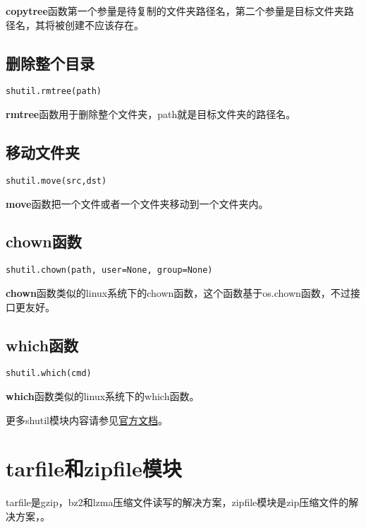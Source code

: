 \documentclass[12pt,oneside]{book}
\begin{document}
\begin{common-format}
\textbf{copytree}函数第一个参量是待复制的文件夹路径名，第二个参量是目标文件夹路径名，其将被创建不应该存在。

\section{删除整个目录}
\begin{Verbatim}
shutil.rmtree(path)
\end{Verbatim}

\textbf{rmtree}函数用于删除整个文件夹，path就是目标文件夹的路径名。

\section{移动文件夹}
\begin{Verbatim}
shutil.move(src,dst)
\end{Verbatim}
\textbf{move}函数把一个文件或者一个文件夹移动到一个文件夹内。



\section{chown函数}
\begin{Verbatim}
shutil.chown(path, user=None, group=None)
\end{Verbatim}

\textbf{chown}函数类似的linux系统下的chown函数，这个函数基于os.chown函数，不过接口更友好。


\section{which函数}
\begin{Verbatim}
shutil.which(cmd)
\end{Verbatim}

\textbf{which}函数类似的linux系统下的which函数。



\begin{large}
更多shutil模块内容请参见\href{https://docs.python.org/3.4/library/shutil.html}{官方文档}。
\end{large}


\chapter{tarfile和zipfile模块}
tarfile是gzip，bz2和lzma压缩文件读写的解决方案，zipfile模块是zip压缩文件的解决方案，。


\end{common-format}
\end{document}
